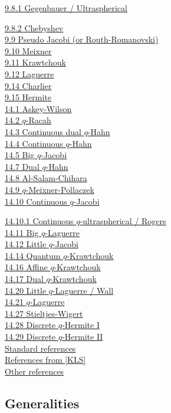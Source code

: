 \documentclass[twoside,11pt]{article}
\newcommand\sa{\smallskipamount}
\newcommand\sLP{\\[\sa]}
\begin{document}
\hyperref[sec9.8.1]{9.8.1 Gegenbauer / Ultraspherical}

\hyperref[sec9.8.2]{9.8.2 Chebyshev}\\
\hyperref[sec9.9]{9.9 Pseudo Jacobi (or Routh-Romanovski)}\\
\hyperref[sec9.10]{9.10 Meixner}\\
\hyperref[sec9.11]{9.11 Krawtchouk}\\
\hyperref[sec9.12]{9.12 Laguerre}\\
\hyperref[sec9.14]{9.14 Charlier}\\
\hyperref[sec9.15]{9.15 Hermite}
\sLP
\hyperref[sec14.1]{14.1 Askey-Wilson}\\
\hyperref[sec14.2]{14.2 $q$-Racah}\\
\hyperref[sec14.3]{14.3 Continuous dual $q$-Hahn}\\
\hyperref[sec14.4]{14.4 Continuous $q$-Hahn}\\
\hyperref[sec14.5]{14.5 Big $q$-Jacobi}\\
\hyperref[sec14.7]{14.7 Dual $q$-Hahn}\\
\hyperref[sec14.8]{14.8 Al-Salam-Chihara}\\
\hyperref[sec14.9]{14.9 $q$-Meixner-Pollaczek}\\
\hyperref[sec14.10]{14.10 Continuous $q$-Jacobi}

\hyperref[sec14.10.1]{14.10.1 Continuous $q$-ultraspherical / Rogers}\\
\hyperref[sec14.11]{14.11 Big $q$-Laguerre}\\
\hyperref[sec14.12]{14.12 Little $q$-Jacobi}\\
\hyperref[sec14.14]{14.14 Quantum $q$-Krawtchouk}\\
\hyperref[sec14.16]{14.16 Affine $q$-Krawtchouk}\\
\hyperref[sec14.17]{14.17 Dual $q$-Krawtchouk}\\
\hyperref[sec14.20]{14.20 Little $q$-Laguerre / Wall}\\
\hyperref[sec14.21]{14.21 $q$-Laguerre}\\
\hyperref[sec14.27]{14.27 Stieltjes-Wigert}\\
\hyperref[sec14.28]{14.28 Discrete $q$-Hermite I}\\
\hyperref[sec14.29]{14.29 Discrete $q$-Hermite II}
\sLP
\hyperref[sec_ref1]{Standard references}\\
\hyperref[sec_ref2]{References from [KLS]}\\
\hyperref[sec_ref3]{Other references}
%
\newpage
%
\subsection*{Generalities}
\label{sec_general}
\end{document}
